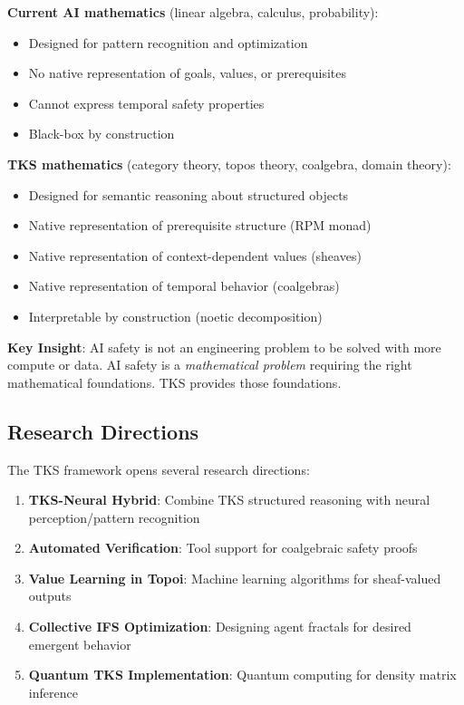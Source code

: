 \documentclass[11pt,twoside]{article}
\theoremstyle{definition}
\theoremstyle{plain}
\theoremstyle{remark}
\begin{document}
\begin{tcolorbox}[colback=green!5!white,colframe=green!60!black,title=\textbf{Summary: What TKS Provides That Current AI Lacks}]

\textbf{Current AI mathematics} (linear algebra, calculus, probability):
\begin{itemize}
  \item Designed for pattern recognition and optimization
  \item No native representation of goals, values, or prerequisites
  \item Cannot express temporal safety properties
  \item Black-box by construction
\end{itemize}

\textbf{TKS mathematics} (category theory, topos theory, coalgebra, domain theory):
\begin{itemize}
  \item Designed for semantic reasoning about structured objects
  \item Native representation of prerequisite structure (RPM monad)
  \item Native representation of context-dependent values (sheaves)
  \item Native representation of temporal behavior (coalgebras)
  \item Interpretable by construction (noetic decomposition)
\end{itemize}

\textbf{Key Insight}: AI safety is not an engineering problem to be solved with more
compute or data. AI safety is a \emph{mathematical problem} requiring the right
mathematical foundations. TKS provides those foundations.

\end{tcolorbox}

\subsection{Research Directions}

The TKS framework opens several research directions:

\begin{enumerate}
  \item \textbf{TKS-Neural Hybrid}: Combine TKS structured reasoning with neural
        perception/pattern recognition
  \item \textbf{Automated Verification}: Tool support for coalgebraic safety proofs
  \item \textbf{Value Learning in Topoi}: Machine learning algorithms for sheaf-valued outputs
  \item \textbf{Collective IFS Optimization}: Designing agent fractals for desired emergent behavior
  \item \textbf{Quantum TKS Implementation}: Quantum computing for density matrix inference
\end{enumerate}
\end{document}
